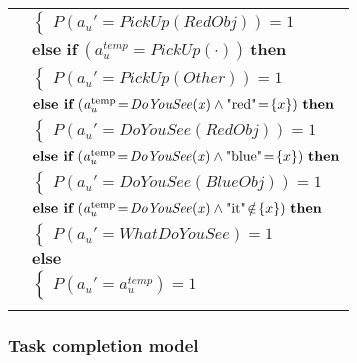 \begin{footnotesize}
\begin{longtable}{p{1cm}l}
& \;\;\;\;\; $ \begin{cases}P(\mathit{a_u}'\!=\!\mathit{PickUp(RedObj)})\!=\!1 \end{cases}$ \vspace{1mm} \\ & $ \textbf{else if} \ (\mathit{a_u^{\text{temp}}}\!=\!\mathit{PickUp(\cdot)}) \ \textbf{then}$ \\
& \;\;\;\;\; $ \begin{cases}P(\mathit{a_u}'\!=\!\mathit{PickUp(Other)})\!=\!1 \end{cases}$ \vspace{1mm} \\ & $ \textbf{else if} \ (\mathit{a_u^{\text{temp}}}\!=\!\mathit{DoYouSee({x})} \land \text{"red"}\!=\!\mathit\{x\}) \ \textbf{then}$ \\
& \;\;\;\;\; $ \begin{cases}P(\mathit{a_u}'\!=\!\mathit{DoYouSee(RedObj)})\!=\!1 \end{cases}$ \vspace{1mm} \\ & $ \textbf{else if} \ (\mathit{a_u^{\text{temp}}}\!=\!\mathit{DoYouSee({x})} \land \text{"blue"}\!=\!\mathit\{x\}) \ \textbf{then}$ \\
& \;\;\;\;\; $ \begin{cases}P(\mathit{a_u}'\!=\!\mathit{DoYouSee(BlueObj)})\!=\!1 \end{cases}$ \vspace{1mm} \\ & $ \textbf{else if} \ (\mathit{a_u^{\text{temp}}}\!=\!\mathit{DoYouSee({x})} \land \text{"it"}\!\notin\!\mathit\{x\}) \ \textbf{then}$ \\
& \;\;\;\;\; $ \begin{cases}P(\mathit{a_u}'\!=\!\mathit{WhatDoYouSee})\!=\!1 \end{cases}$ \vspace{1mm} \\ & $ \textbf{else}$ \\
& \;\;\;\;\; $ \begin{cases}P(\mathit{a_u}'\!=\!\mathit{{a_u^{\text{temp}}}})\!=\!1 \end{cases}$ \\ \\[-1mm]
\end{longtable}
\end{footnotesize}

\subsubsection*{Task completion model}

